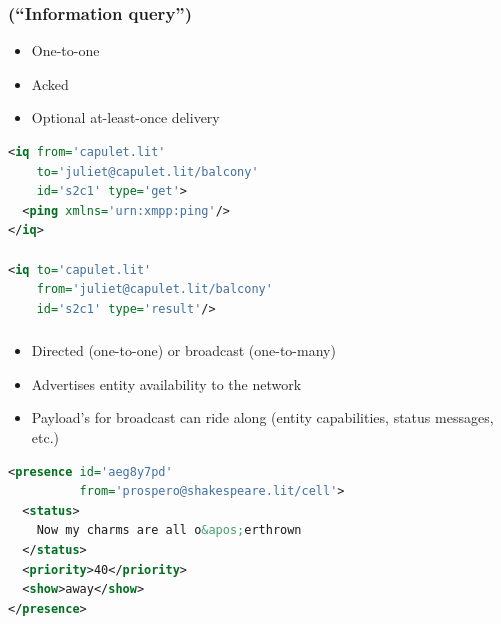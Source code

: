 \documentclass[xelatex,aspectratio=169]{beamer}
\begin{document}
\begin{frame}[fragile]
	\frametitle{ (``Information query'')}
		\begin{itemize}
		\item One-to-one
		\item Acked
		\item Optional at-least-once delivery
		\end{itemize}
\begin{lstlisting}[frame=single,language=xml]
<iq from='capulet.lit'
    to='juliet@capulet.lit/balcony'
    id='s2c1' type='get'>
  <ping xmlns='urn:xmpp:ping'/>
</iq>

<iq to='capulet.lit'
    from='juliet@capulet.lit/balcony'
    id='s2c1' type='result'/>
\end{lstlisting}
\end{frame}

\begin{frame}[fragile]
	\frametitle{}
	\begin{itemize}
	\item Directed (one-to-one) or broadcast (one-to-many)
	\item Advertises entity availability to the network
	\item Payload's for broadcast can ride along (entity capabilities, status
		messages, etc.)
	\end{itemize}
\begin{lstlisting}[frame=single,language=xml]
<presence id='aeg8y7pd'
          from='prospero@shakespeare.lit/cell'>
  <status>
    Now my charms are all o&apos;erthrown
  </status>
  <priority>40</priority>
  <show>away</show>
</presence>
\end{lstlisting}
\end{frame}
\end{document}
